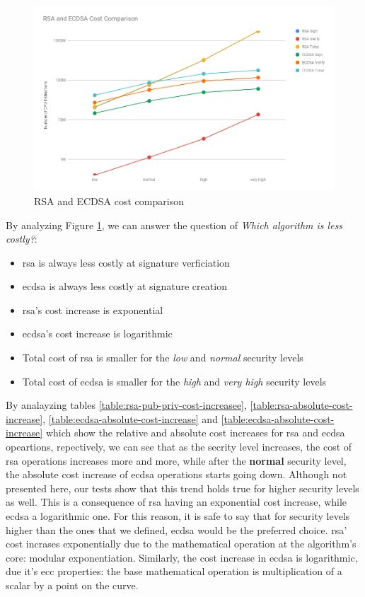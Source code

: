 \documentclass{llncs}
\begin{document}
\begin{figure}
  \centering
  \includegraphics[width=1.0\textwidth]{img/rsa_ecdsa_costs_all.png}
  \centering \caption{\label{fig:ecdsa-rsa-costs-all} RSA and ECDSA cost comparison}
\end{figure}

By analyzing Figure \ref{fig:ecdsa-rsa-costs-all}, we can answer the question of \textit{Which algorithm is less costly?}:

\begin{itemize}
  \item \gls{rsa} is always less costly at signature verficiation
  \item \gls{ecdsa} is always less costly at signature creation
  \item \gls{rsa}'s cost increase is exponential
  \item \gls{ecdsa}'s cost increase is logarithmic
  \item Total cost of \gls{rsa} is smaller for the \textit{low} and \textit{normal} security levels
  \item Total cost of \gls{ecdsa} is smaller for the \textit{high} and \textit{very high} security levels
\end{itemize}

By analayzing tables \ref{table:rsa-pub-priv-cost-increasee}, \ref{table:rsa-absolute-cost-increase}, \ref{table:ecdsa-absolute-cost-increase} and
\ref{table:ecdsa-absolute-cost-increase} which show the relative and absolute cost increases for \gls{rsa} and \gls{ecdsa} opeartions, repectively,
we can see that as the secrity level increases, the cost of \gls{rsa} operations increases more and more, while after the \textbf{normal} security
level, the absolute cost increase of \gls{ecdsa} operations starts going down. Although not presented here, our tests show that this trend holds true
for higher security levels as well. This is a consequence of \gls{rsa} having an exponential cost increase, while \gls{ecdsa} a logarithmic one.
For this reason, it is safe to say that for security levels higher than the ones that we defined, \gls{ecdsa} would be the preferred choice.
\gls{rsa}' cost incrases exponentially due to the mathematical operation at the algorithm's core: modular exponentiation. Similarly, the cost
increase in \gls{ecdsa} is logarithmic, due it's \gls{ecc} properties: the base mathematical operation is multiplication of a scalar by a point on the
curve.
\end{document}
